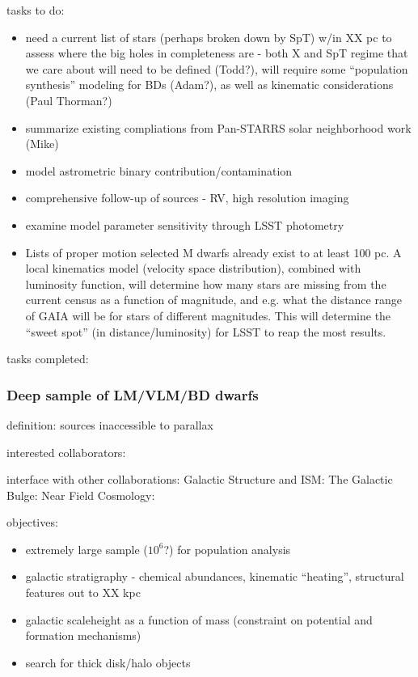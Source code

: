 tasks to do: 
\begin{itemize}
\item{need 
a current list of stars (perhaps broken down by SpT) w/in XX pc to assess where the 
big holes in completeness are - both X and SpT regime that we care about will need to  be defined (Todd?), will require some “population synthesis” modeling for BDs (Adam?),  as well as kinematic considerations (Paul Thorman?) }
\item{summarize 
existing compliations from Pan-STARRS solar neighborhood work (Mike) }
\item{model 
astrometric binary contribution/contamination }
\item{comprehensive 
follow-up of sources - RV, high resolution imaging }
\item{examine 
model parameter sensitivity through LSST photometry }
\item{Lists 
of proper motion selected M dwarfs already exist to at least 100 pc. A local  kinematics model (velocity space distribution), combined with luminosity function, will  determine how many stars are missing from the current census as a function of  magnitude, and e.g. what the distance range of GAIA will be for stars of different  magnitudes. This will determine the “sweet spot” (in distance/luminosity) for LSST to  reap the most results. }
\end{itemize}


tasks completed: 

\subsubsection{Deep sample of LM/VLM/BD dwarfs}

definition: sources inaccessible to parallax  

interested collaborators:  

interface with other collaborations: 
Galactic Structure and ISM: 
The Galactic Bulge: 
Near Field Cosmology: 

objectives: 
\begin{itemize}
\item{extremely 
large sample ($10^6$?) for population analysis }
\item{galactic 
stratigraphy - chemical abundances, kinematic “heating”, structural features 
out to XX kpc }
\item{galactic 
scaleheight as a function of mass (constraint on potential and formation 
mechanisms)} 
\item{search 
for thick disk/halo objects }
\end{itemize}

